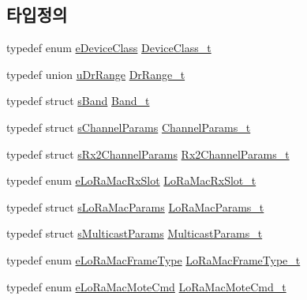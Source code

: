 \subsection*{타입정의}
\begin{DoxyCompactItemize}
\item 
typedef enum \mbox{\hyperlink{group___l_o_r_a_m_a_c_ga133e92597739340bac439d1b0916dcb6}{e\+Device\+Class}} \mbox{\hyperlink{group___l_o_r_a_m_a_c_ga29dc2e097802faaf8fbd0e18ff99695f}{Device\+Class\+\_\+t}}
\item 
typedef union \mbox{\hyperlink{unionu_dr_range}{u\+Dr\+Range}} \mbox{\hyperlink{group___l_o_r_a_m_a_c_ga8b818a36013d6bdd83ac5fd20f42b503}{Dr\+Range\+\_\+t}}
\item 
typedef struct \mbox{\hyperlink{structs_band}{s\+Band}} \mbox{\hyperlink{group___l_o_r_a_m_a_c_ga8f49721ee96ceb52c80a896ab11a2ed8}{Band\+\_\+t}}
\item 
typedef struct \mbox{\hyperlink{structs_channel_params}{s\+Channel\+Params}} \mbox{\hyperlink{group___l_o_r_a_m_a_c_ga1360ca6f82c6d125ea43a9dad9b56184}{Channel\+Params\+\_\+t}}
\item 
typedef struct \mbox{\hyperlink{structs_rx2_channel_params}{s\+Rx2\+Channel\+Params}} \mbox{\hyperlink{group___l_o_r_a_m_a_c_ga8f57f29481ea92c24f6af04b96a95e0f}{Rx2\+Channel\+Params\+\_\+t}}
\item 
typedef enum \mbox{\hyperlink{group___l_o_r_a_m_a_c_ga933a5a2f7d57b1a5cb22f061e30558fe}{e\+Lo\+Ra\+Mac\+Rx\+Slot}} \mbox{\hyperlink{group___l_o_r_a_m_a_c_ga082bd3322087fa2f42c902a0b360ff4f}{Lo\+Ra\+Mac\+Rx\+Slot\+\_\+t}}
\item 
typedef struct \mbox{\hyperlink{structs_lo_ra_mac_params}{s\+Lo\+Ra\+Mac\+Params}} \mbox{\hyperlink{group___l_o_r_a_m_a_c_gad9c979008eadcd47b4d0f90bdae38b44}{Lo\+Ra\+Mac\+Params\+\_\+t}}
\item 
typedef struct \mbox{\hyperlink{structs_multicast_params}{s\+Multicast\+Params}} \mbox{\hyperlink{group___l_o_r_a_m_a_c_ga02d2523505cac70954c043074087ea65}{Multicast\+Params\+\_\+t}}
\item 
typedef enum \mbox{\hyperlink{group___l_o_r_a_m_a_c_ga5e02f214e1a4b8578c415045367c0a11}{e\+Lo\+Ra\+Mac\+Frame\+Type}} \mbox{\hyperlink{group___l_o_r_a_m_a_c_ga3772acf0e9af9869ead480132e733cb2}{Lo\+Ra\+Mac\+Frame\+Type\+\_\+t}}
\item 
typedef enum \mbox{\hyperlink{group___l_o_r_a_m_a_c_gaa56523d6cd76c438d6bc4263b5254d73}{e\+Lo\+Ra\+Mac\+Mote\+Cmd}} \mbox{\hyperlink{group___l_o_r_a_m_a_c_ga7ef7dff520934ecc71835673f2acd015}{Lo\+Ra\+Mac\+Mote\+Cmd\+\_\+t}}

\end{DoxyCompactItemize}

